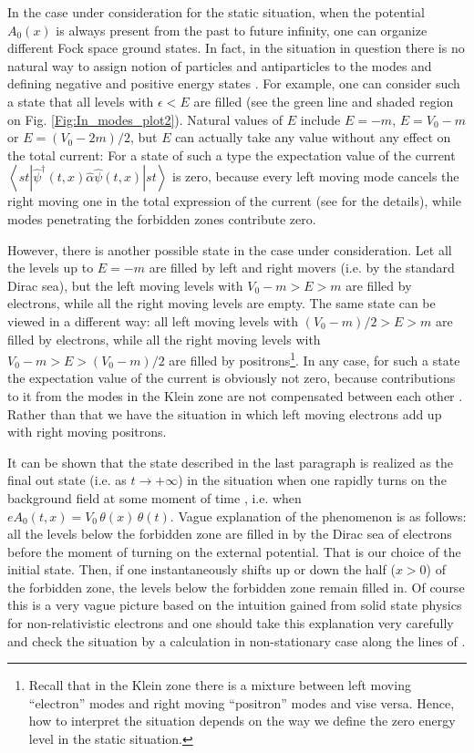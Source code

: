 \documentclass[12pt]{article}
\begin{document}
In the case under consideration for the static situation, when the potential $A_0(x)$ is always present from the past to future infinity, one can organize different Fock space ground states. In fact, in the situation in question there is no natural way to assign notion of particles and antiparticles to the modes and defining negative and positive energy states \cite{Akhmedov:2025jtk}. 
For example, one can consider such a state that all levels with $\epsilon < E$ are filled (see the green line and shaded region on Fig. \ref{Fig:In_modes_plot2}). Natural values of $E$ include $E=-m$, $E=V_0-m$ or $E = (V_0 - 2m)/2$, but $E$ can actually take any value without any effect on the total current: For a state of such a type the expectation value of the current $\left\langle st\left|\hat{\psi}^{\dagger}(t,x)\hat{\alpha}\hat{\psi}(t,x)\right|st\right\rangle$ is zero, because every left moving mode cancels the right moving one in the total expression of the current (see \cite{Akhmedov:2025jtk} for the details), while modes penetrating the forbidden zones contribute zero.

However, there is another possible state in the case under consideration. Let all the levels up to $E=-m$ are filled by left and right movers (i.e. by the standard Dirac sea), but the left moving levels with $V_0 - m > E > m$ are filled by electrons, while all the right moving levels are empty. The same state can be viewed in a different way: all left moving levels with $(V_0 - m)/2 > E > m$ are filled by electrons, while all the right moving levels with $V_0 - m > E > (V_0 - m)/2$ are filled by positrons\footnote{Recall that in the Klein zone there is a mixture between left moving ``electron'' modes and right moving ``positron'' modes and vise versa. Hence, how to interpret the situation depends on the way we define the zero energy level in the static situation.}. In any case, for such a state the expectation value of the current is obviously not zero, because contributions to it from the modes in the Klein zone are not compensated between each other \cite{Akhmedov:2025jtk}. Rather than that we have the situation in which left moving electrons add up with right moving positrons.

It can be shown that the state described in the last paragraph is realized as the final out state (i.e. as $t\to +\infty$) in the situation when one rapidly turns on the background field at some moment of time \cite{Akhmedov:2025jtk}, i.e. when $e A_0(t,x) = V_0 \, \theta (x) \, \theta(t)$. Vague explanation of the phenomenon is as follows: all the levels below the forbidden zone are filled in by the Dirac sea of electrons before the moment of turning on the external potential. That is our choice of the initial state. Then, if one instantaneously shifts up or down the half ($x>0$) of the forbidden zone, the levels below the forbidden zone remain filled in. Of course this is a very vague picture based on the intuition gained from solid state physics for non-relativistic electrons and one should take this explanation very carefully and check the situation by a calculation in non-stationary case along the lines of \cite{Akhmedov:2025jtk}.
\end{document}
